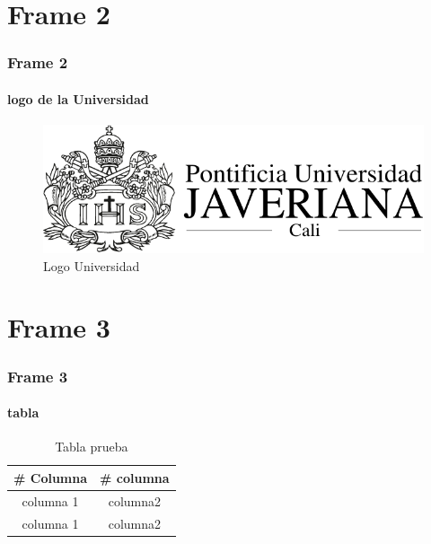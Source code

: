 \documentclass[]{beamer}
\begin{document}
\section{Frame 2}
\begin{frame}
  \frametitle{Frame 2}
  \framesubtitle{logo de la Universidad}

  \begin{figure}[h]
    \centering
    \includegraphics[scale=0.5]{img/pujlogo.pdf}
    \caption{Logo Universidad}
  \end{figure}

\end{frame}


\section{Frame 3}
\begin{frame}
  \frametitle{Frame 3}
  \framesubtitle{tabla}

  \begin{table}[h]
    \centering
    \begin{tabular}{|c|c|}
      \hline
      \# Columna & \# columna \\
      \hline \hline
      columna 1 & columna2 \\
      columna 1 & columna2 \\
      \hline
    \end{tabular}
    \caption{Tabla prueba}
  \end{table}

\end{frame}
\end{document}
